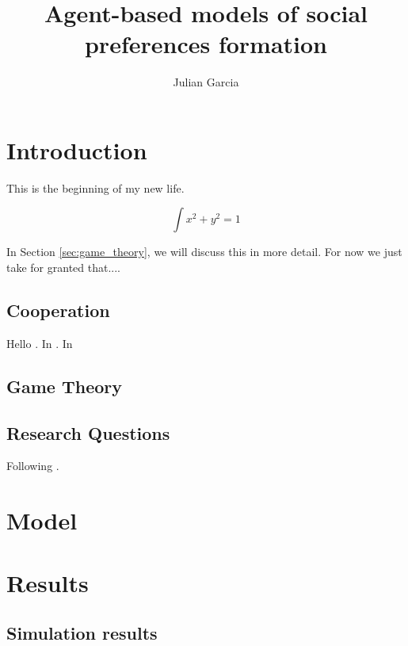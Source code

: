 \documentclass[11pt]{report}
\title{Agent-based models of social preferences formation}
\author{Julian Garcia}
\begin{document}
\maketitle
\tableofcontents

\chapter{Introduction}

This is the beginning of my new life.

$$\int x^2 + y ^2 = 1$$

In Section \ref{sec:game_theory}, we will discuss this in more detail.
For now we just take for granted that.... 

\section{Cooperation}

Hello \cite{garcia:JTB:2012}. In \cite{herron:SciRep:2019}. In \cite{bertels:GEN:2017}

\section{Game Theory \label{sec:game_theory}}

\section{Research Questions}

Following \cite{eberhart:CEC:2001}.

\chapter{Model}

\chapter{Results}
\section{Simulation results}



\end{document}
